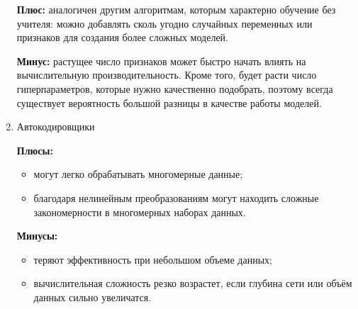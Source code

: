 \documentclass[bachelor, och, referat]{../shiza}
\begin{document}
\begin{enumerate}
        \textbf{Плюс:} аналогичен другим алгоритмам, которым характерно обучение
        без учителя: можно добавлять сколь угодно случайных переменных или
        признаков для создания более сложных моделей.

        \textbf{Минус:} растущее число признаков может быстро начать влиять на
        вычислительную производительность. Кроме того, будет расти число
        гиперпараметров, которые нужно качественно подобрать, поэтому всегда
        существует вероятность большой разницы в качестве работы моделей.

        \item Автокодировщики
        
        \textbf{Плюсы:}
        \begin{itemize}
            \item могут легко обрабатывать многомерные данные;
            \item благодаря нелинейным преобразованиям могут находить сложные
            закономерности в многомерных наборах данных.
        \end{itemize}

        \textbf{Минусы:}
        \begin{itemize}
            \item теряют эффективность при небольшом объеме данных;
            \item вычислительная сложность резко возрастет, если глубина сети
            или объём данных сильно увеличатся.
        \end{itemize}

    \end{enumerate}



% 

\end{document}
